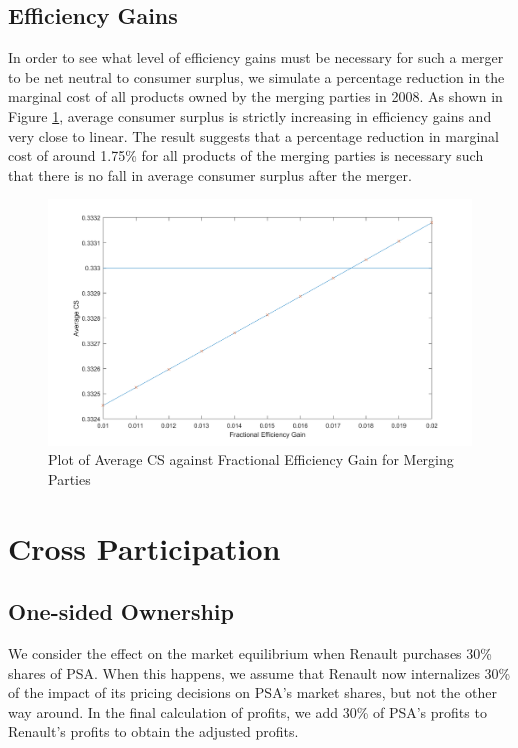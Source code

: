 \documentclass[a4paper,12pt]{article}
\begin{document}
\subsection{Efficiency Gains}

In order to see what level of efficiency gains must be necessary for such a merger to be net neutral to consumer surplus, we simulate a percentage reduction in the marginal cost of all products owned by the merging parties in 2008. As shown in Figure \ref{efficiency}, average consumer surplus is strictly increasing in efficiency gains and very close to linear. The result suggests that a percentage reduction in marginal cost of around 1.75\% for all products of the merging parties is necessary such that there is no fall in average consumer surplus after the merger.

\begin{figure}[h!]
    \centering
    \includegraphics[scale=0.4]{efficiency.png}
    \caption{Plot of Average CS against Fractional Efficiency Gain for Merging Parties}
    \label{efficiency}
\end{figure}

\section{Cross Participation}

\subsection{One-sided Ownership}

We consider the effect on the market equilibrium when Renault purchases 30\% shares of PSA. When this happens, we assume that Renault now internalizes 30\% of the impact of its pricing decisions on PSA's market shares, but not the other way around. In the final calculation of profits, we add 30\% of PSA's profits to Renault's profits to obtain the adjusted profits.
\end{document}
